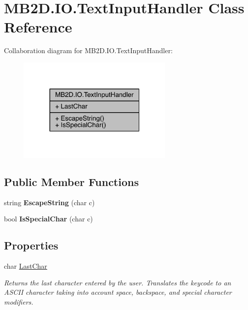 \hypertarget{class_m_b2_d_1_1_i_o_1_1_text_input_handler}{}\section{M\+B2\+D.\+I\+O.\+Text\+Input\+Handler Class Reference}
\label{class_m_b2_d_1_1_i_o_1_1_text_input_handler}


Collaboration diagram for M\+B2\+D.\+I\+O.\+Text\+Input\+Handler\+:\nopagebreak
\begin{figure}[H]
\begin{center}
\leavevmode
\includegraphics[width=215pt]{class_m_b2_d_1_1_i_o_1_1_text_input_handler__coll__graph}
\end{center}
\end{figure}
\subsection*{Public Member Functions}
\begin{DoxyCompactItemize}
\item 
\hypertarget{class_m_b2_d_1_1_i_o_1_1_text_input_handler_aebc1a5d52a49c769347ecaae106ff670}{}\label{class_m_b2_d_1_1_i_o_1_1_text_input_handler_aebc1a5d52a49c769347ecaae106ff670} 
string {\bfseries Escape\+String} (char c)
\item 
\hypertarget{class_m_b2_d_1_1_i_o_1_1_text_input_handler_afd04f2a2de624d589acc777c382d1b3c}{}\label{class_m_b2_d_1_1_i_o_1_1_text_input_handler_afd04f2a2de624d589acc777c382d1b3c} 
bool {\bfseries Is\+Special\+Char} (char c)
\end{DoxyCompactItemize}
\subsection*{Properties}
\begin{DoxyCompactItemize}
\item 
char \hyperlink{class_m_b2_d_1_1_i_o_1_1_text_input_handler_a874b0ae4b35ff53064c893e49562dfeb}{Last\+Char}
\begin{DoxyCompactList}\small\item\em Returns the last character entered by the user. Translates the keycode to an A\+S\+C\+II character taking into account space, backspace, and special character modifiers. \end{DoxyCompactList}\end{DoxyCompactItemize}


